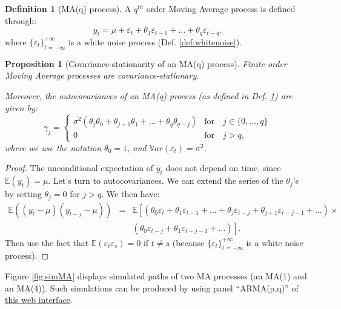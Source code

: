 \documentclass[
  12pt,
]{book}
\newtheorem{proposition}{Proposition}[chapter]
\theoremstyle{definition}
\newtheorem{definition}{Definition}[chapter]
\theoremstyle{definition}
\theoremstyle{definition}
\theoremstyle{definition}
\theoremstyle{remark}
\begin{document}
\begin{definition}[MA(q) process]
\protect\hypertarget{def:MAq}{}\label{def:MAq}A \(q^{th}\) order Moving Average process is defined through:
\[
y_t = \mu + \varepsilon_t + \theta_1 \varepsilon_{t-1} + \dots + \theta_q \varepsilon_{t-q}.
\]
where \(\{\varepsilon_t\}_{t = -\infty}^{+\infty}\) is a white noise process (Def. \ref{def:whitenoise}).
\end{definition}

\begin{proposition}[Covariance-stationarity of an MA(q) process]
\protect\hypertarget{prp:covMAq}{}\label{prp:covMAq}Finite-order Moving Average processes are covariance-stationary.

Moreover, the autocovariances of an MA(q) process (as defined in Def. \ref{def:MAq}) are given by:
\begin{equation}
\gamma_j = \left\{ \begin{array}{ll} \sigma^2(\theta_j\theta_0 + \theta_{j+1}\theta_{1} +  \dots + \theta_{q}\theta_{q-j}) &\mbox{for} \quad j \in \{0,\dots,q\} \\ 0 &\mbox{for} \quad j>q, \end{array} \right.\label{eq:autocovMA}
\end{equation}
where we use the notation \(\theta_0=1\), and \(\mathbb{V}ar(\varepsilon_t)=\sigma^2\).
\end{proposition}

\begin{proof}
The unconditional expectation of \(y_t\) does not depend on time, since \(\mathbb{E}(y_t)=\mu\). Let's turn to autocovariances. We can extend the series of the \(\theta_j\)'s by setting \(\theta_j=0\) for \(j>q\). We then have:
\begin{eqnarray*}
\mathbb{E}((y_t-\mu)(y_{t-j}-\mu)) &=& \mathbb{E}\left[(\theta_0 \varepsilon_t +\theta_1 \varepsilon_{t-1} + \dots +\theta_j \varepsilon_{t-j}+\theta_{j+1} \varepsilon_{t-j-1} + \dots) \right.\times \\
&&\left. (\theta_0 \varepsilon_{t-j} +\theta_1 \varepsilon_{t-j-1} + \dots)\right].
\end{eqnarray*}
Then use the fact that \(\mathbb{E}(\varepsilon_t\varepsilon_s)=0\) if \(t \ne s\) (because \(\{\varepsilon_t\}_{t = -\infty}^{+\infty}\) is a white noise process).
\end{proof}

Figure \ref{fig:simMA} displays simulated paths of two MA processes (an MA(1) and an MA(4)). Such simulations can be produced by using panel ``ARMA(p,q)'' of \href{https://jrenne.shinyapps.io/MacroEc/}{this web interface}.
\end{document}
